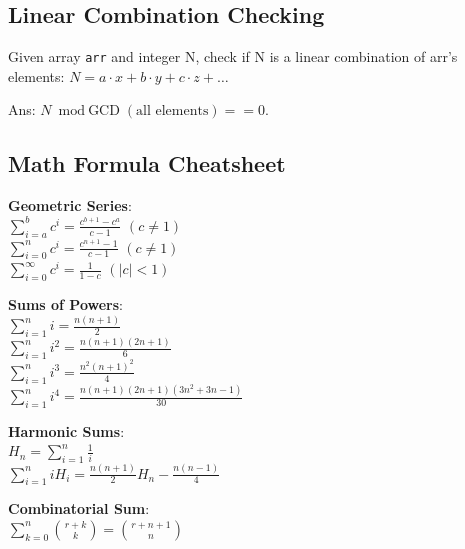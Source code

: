\subsection{Linear Combination Checking}
Given array \texttt{arr} and integer N, check if N is
a linear combination of arr's elements:
$N = a \cdot x + b \cdot y + c \cdot z + \ldots$

Ans: $N \bmod \text{GCD}(\text{all elements}) == 0$.

\subsection{Math Formula Cheatsheet}
\textbf{Geometric Series}: \\
\textbullet{} $\sum_{i=a}^b c^i = \frac{c^{b+1} - c^a}{c - 1}$ $(c \neq 1)$ \\
\textbullet{} $\sum_{i=0}^n c^i = \frac{c^{n+1}-1}{c-1}$ $(c \neq 1)$ \\
\textbullet{} $\sum_{i=0}^\infty c^i = \frac{1}{1-c}$ $(|c| < 1)$

\textbf{Sums of Powers}: \\
\textbullet{} $\sum_{i=1}^n i = \frac{n(n+1)}{2}$ \\
\textbullet{} $\sum_{i=1}^n i^2 = \frac{n(n+1)(2n+1)}{6}$ \\
\textbullet{} $\sum_{i=1}^n i^3 = \frac{n^2(n+1)^2}{4}$ \\
\textbullet{} $\sum_{i=1}^n i^4 = \frac{n(n+1)(2n+1)(3n^2+3n-1)}{30}$

\textbf{Harmonic Sums}: \\
\textbullet{} $H_n = \sum_{i=1}^n \frac{1}{i}$ \\
\textbullet{} $\sum_{i=1}^n i H_i = \frac{n(n+1)}{2} H_n - \frac{n(n-1)}{4}$

\textbf{Combinatorial Sum}: \\
\textbullet{} $\sum_{k=0}^n \binom{r+k}{k} = \binom{r+n+1}{n}$
